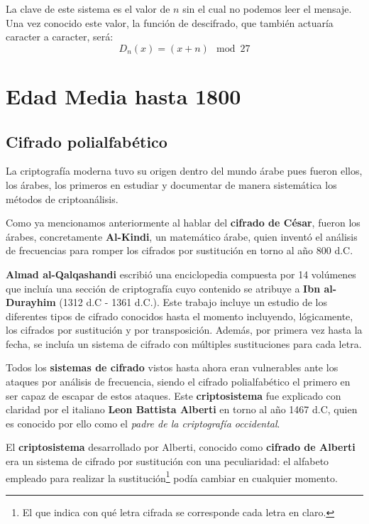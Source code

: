 \documentclass[nochap]{apuntesURJC}
\begin{document}
La clave de este sistema es el valor de $n$ sin el cual no podemos leer el mensaje. Una vez conocido este valor, la función de descifrado, que también actuaría caracter a caracter, será:
\[D_n(x)=(x+n) \mod 27\]

\section{Edad Media hasta 1800}

\subsection{Cifrado polialfabético}
La criptografía moderna tuvo su origen dentro del mundo árabe pues fueron ellos, los árabes, los primeros en estudiar y documentar de manera sistemática los métodos de criptoanálisis.

Como ya mencionamos anteriormente al hablar del \textbf{cifrado de César}, fueron los árabes, concretamente \textbf{Al-Kindi}, un matemático árabe, quien inventó el análisis de frecuencias para romper los cifrados por sustitución en torno al año 800 d.C.

\textbf{Almad al-Qalqashandi} escribió una enciclopedia compuesta por 14 volúmenes que incluía una sección de criptografía cuyo contenido se atribuye a \textbf{Ibn al-Durayhim} (1312 d.C - 1361 d.C.). Este trabajo incluye un estudio de los diferentes tipos de cifrado conocidos hasta el momento incluyendo, lógicamente, los cifrados por sustitución y por transposición. Además, por primera vez hasta la fecha, se incluía un sistema de cifrado con múltiples sustituciones para cada letra.

Todos los \textbf{sistemas de cifrado} vistos hasta ahora eran vulnerables ante los ataques por análisis de frecuencia, siendo el cifrado polialfabético el primero en ser capaz de escapar de estos ataques. Este \textbf{criptosistema} fue explicado con claridad por el italiano \textbf{Leon Battista Alberti} en torno al año 1467 d.C, quien es conocido por ello como el \textit{padre de la criptografía occidental}.

El \textbf{criptosistema} desarrollado por Alberti, conocido como \textbf{cifrado de Alberti} era un sistema de cifrado por sustitución con una peculiaridad: el alfabeto empleado para realizar la sustitución\footnote{El que indica con qué letra cifrada se corresponde cada letra en claro.} podía cambiar en cualquier momento.
\end{document}
